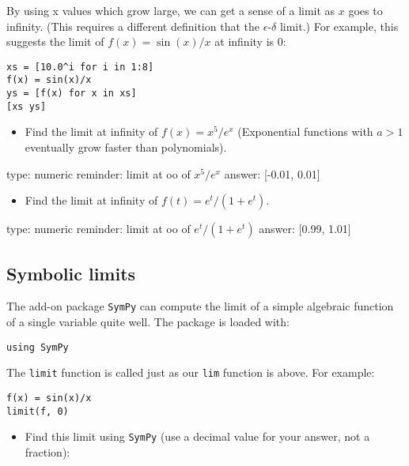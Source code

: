 \documentclass[12pt]{article}
\begin{document}
By using x values which grow large, we can get a sense of a limit as $x$
goes to infinity. (This requires a different definition that the
$\epsilon$-$\delta$ limit.) For example, this suggests the limit of
$f(x) = \sin(x)/x$ at infinity is $0$:



\begin{verbatim}
xs = [10.0^i for i in 1:8]
f(x) = sin(x)/x
ys = [f(x) for x in xs]
[xs ys]
\end{verbatim}
\begin{itemize}
\itemsep1pt\parskip0pt
\item
  Find the limit at infinity of $f(x) = x^5/e^x$ (Exponential functions
  with $a>1$ eventually grow faster than polynomials).
\end{itemize}

\begin{answer}
    type: numeric
    reminder: limit at oo of \( x^5/e^x \)
    answer: [-0.01, 0.01]

\end{answer}

\begin{itemize}
\itemsep1pt\parskip0pt
\item
  Find the limit at infinity of $f(t) = e^t / (1 + e^t)$.
\end{itemize}

\begin{answer}
    type: numeric
    reminder: limit at oo of \( e^t / (1 + e^t) \)
    answer: [0.99, 1.01]

\end{answer}

\subsection{Symbolic limits}

The add-on package \texttt{SymPy} can compute the limit of a simple
algebraic function of a single variable quite well. The package is
loaded with:



\begin{verbatim}
using SymPy
\end{verbatim}
The \texttt{limit} function is called just as our \texttt{lim} function
is above. For example:



\begin{verbatim}
f(x) = sin(x)/x
limit(f, 0)
\end{verbatim}
\begin{itemize}
\itemsep1pt\parskip0pt
\item
  Find this limit using \texttt{SymPy} (use a decimal value for your
  answer, not a fraction):
\end{itemize}
\end{document}

